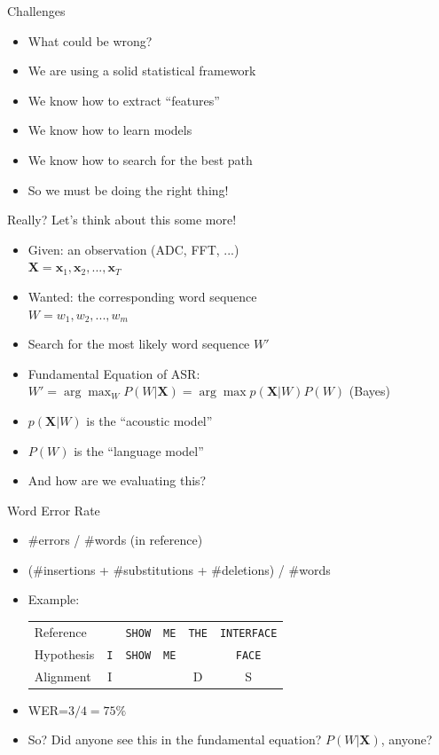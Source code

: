 \begin{frame}{Challenges}
  \begin{itemize}
  \item What could be wrong?
  \item We are using a solid statistical framework
  \item We know how to extract ``features''
  \item We know how to learn models
  \item We know how to search for the best path
  \item So we must be doing the right thing!
  \end{itemize}
\end{frame}

\begin{frame}{Really? Let's think about this some more!}
  \begin{itemize}
    \item Given: an observation (ADC, FFT, ...)\\
      $\boldsymbol{X} = \boldsymbol{x}_1, \boldsymbol{x}_2, ..., \boldsymbol{x}_T$
    \item Wanted: the corresponding word sequence\\
      $W = w_1, w_2, ..., w_m$
    \item Search for the most likely word sequence $W'$
    \item Fundamental Equation of ASR: \\
      $W' = \arg \max_W P(W|\boldsymbol{X}) = \arg \max p(\boldsymbol{X}|W) P(W) $ \hspace{1cm} (Bayes)
    \item $p(\boldsymbol{X}|W)$ is the ``acoustic model''
    \item $P(W)$ is the ``language model''
    \item And how are we evaluating this?
  \end{itemize}
\end{frame}

\begin{frame}{Word Error Rate}
  \begin{itemize}
    \item \#errors / \#words (in reference)
    \item (\#insertions + \#substitutions + \#deletions) / \#words
    \item Example:\\
      \begin{tabular}{lccccc}
        Reference  &            & \texttt{SHOW} & \texttt{ME} & \texttt{THE} & \texttt{INTERFACE} \\
        Hypothesis & \texttt{I} & \texttt{SHOW} & \texttt{ME} &              & \texttt{FACE} \\
        Alignment  & \textsc{I} &               &             & \textsc{D}   & \textsc{S} \\
      \end{tabular}
    \item WER=$3/4=75\%$
    \item So? Did anyone see this in the fundamental equation? $P(W|\boldsymbol{X})$, anyone?
  \end{itemize}
\end{frame}

